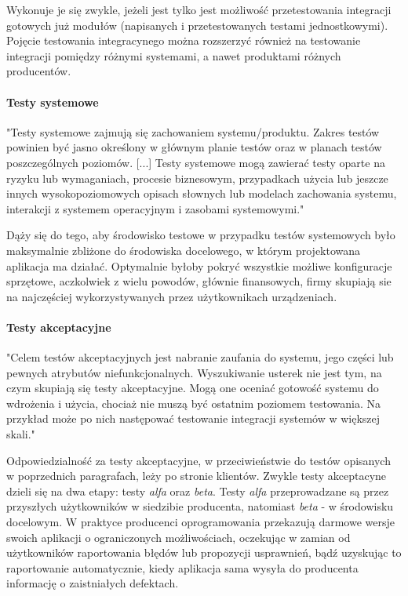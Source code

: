 Wykonuje je się zwykle, jeżeli jest tylko jest możliwość przetestowania integracji gotowych już modułów (napisanych i przetestowanych testami jednostkowymi). Pojęcie testowania integracynego można rozszerzyć również na testowanie integracji pomiędzy różnymi systemami, a nawet produktami różnych producentów. 

\paragraph{Testy systemowe}

"Testy systemowe zajmują się zachowaniem systemu/produktu. Zakres testów powinien być jasno określony w głównym planie testów oraz w planach testów poszczególnych poziomów. [...] Testy systemowe mogą zawierać testy oparte na ryzyku lub wymaganiach, procesie biznesowym, przypadkach użycia lub jeszcze innych wysokopoziomowych opisach słownych lub modelach zachowania systemu, interakcji z systemem operacyjnym i zasobami systemowymi."\cite{bib:sylabus:foundation}

Dąży się do tego, aby środowisko testowe w przypadku testów systemowych było maksymalnie zbliżone do środowiska docelowego, w którym projektowana aplikacja ma działać. Optymalnie byłoby pokryć wszystkie możliwe konfiguracje sprzętowe, aczkolwiek z wielu powodów, głównie finansowych, firmy skupiają sie na najczęściej wykorzystywanych przez użytkownikach urządzeniach. 

\paragraph{Testy akceptacyjne}

"Celem testów akceptacyjnych jest nabranie zaufania do systemu, jego części lub pewnych atrybutów niefunkcjonalnych. Wyszukiwanie usterek nie jest tym, na czym skupiają się testy akceptacyjne. Mogą one oceniać gotowość systemu do wdrożenia i użycia, chociaż nie muszą być ostatnim poziomem testowania. Na przykład może po nich następować testowanie integracji systemów w większej skali."\cite{bib:sylabus:foundation}

Odpowiedzialność za testy akceptacyjne, w przeciwieństwie do testów opisanych w poprzednich paragrafach, leży po stronie klientów. Zwykle testy akceptacyne dzieli się na dwa etapy: testy \textit{alfa} oraz \textit{beta}. Testy \textit{alfa} przeprowadzane są przez przyszłych użytkowników w siedzibie producenta, natomiast \textit{beta} - w środowisku docelowym. W praktyce producenci oprogramowania przekazują darmowe wersje swoich aplikacji o ograniczonych możliwościach, oczekując w zamian od użytkowników raportowania błędów lub propozycji usprawnień, bądź uzyskując to raportowanie automatycznie, kiedy aplikacja sama wysyła do producenta informację o zaistniałych defektach.

